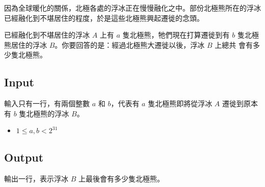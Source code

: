 
因為全球暖化的關係，北極各處的浮冰正在慢慢融化之中。部份北極熊所在的浮冰已經融化到不堪居住的程度，於是這些北極熊興起遷徙的念頭。

已經融化到不堪居住的浮冰 $A$ 上有 $a$ 隻北極熊，牠們現在打算遷徙到有 $b$ 隻北極熊居住的浮冰 $B$。你要回答的是：經過北極熊大遷徙以後，浮冰 $B$ 上總共 會有多少隻北極熊。

\subsection*{Input}

輸入只有一行，有兩個整數 $a$ 和 $b$，代表有 $a$ 隻北極熊即將從浮冰 $A$ 遷徙到原本有 $b$ 隻北極熊的浮冰 $B$。

\begin{itemize}
    \item $1 \leq a, b < 2^{31}$
\end{itemize}

\subsection*{Output}

輸出一行，表示浮冰 $B$ 上最後會有多少隻北極熊。
